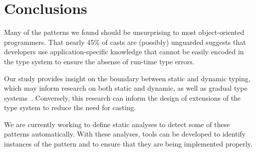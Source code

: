 \section{Conclusions}
\label{sec:casts:conclusions}

Many of the patterns we found should be unsurprising to most object-oriented programmers.
That nearly 45\% of casts are (possibly) unguarded 
suggests that developers use application-specific knowledge that cannot be easily encoded in
the type system to ensure the absense of run-time type errors.

Our study provides insight on the boundary between static and dynamic typing, which may inform
research on both static and dynamic, as well as gradual type systems~\cite{Siek06gradualtyping}.
Conversely, this research can inform the design of extensions of the \java{} type system to reduce the need for casting.

We are currently working to define static analyses to detect some of these patterns automatically.
With these analyses,
tools can be developed to identify instances of the pattern and to ensure that they are being implemented properly.